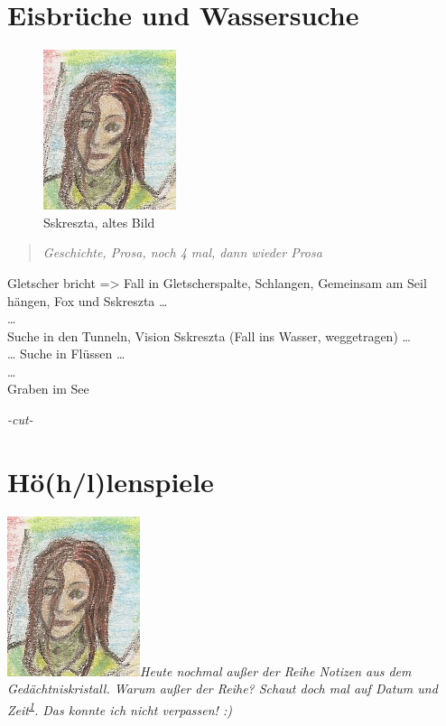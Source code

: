 \documentclass[11pt]{scrartcl}
\begin{document}
\section{Eisbrüche und Wassersuche}

\begin{figure}[htbp]
\centering
\includegraphics{sskreszta-portrait-alt-klein.png}
\caption{Sskreszta, altes Bild}
\end{figure}

\begin{quote}
\emph{Geschichte, Prosa, noch 4 mal, dann wieder Prosa}

\end{quote}
Gletscher bricht =\textgreater{} Fall in Gletscherspalte, Schlangen,
Gemeinsam am Seil hängen, Fox und Sskreszta \ldots{}\\ \ldots{}\\ Suche
in den Tunneln, Vision Sskreszta (Fall ins Wasser, weggetragen)
\ldots{}\\ \ldots{} Suche in Flüssen \ldots{}\\ \ldots{}\\ Graben im See

\emph{-cut-}

\section{Hö(h/l)lenspiele}

\includegraphics{sskreszta-portrait-alt-klein.png}\emph{Heute
nochmal außer der Reihe Notizen aus dem Gedächtniskristall. Warum außer
der Reihe? Schaut doch mal auf Datum und
Zeit\textsuperscript{\href{http://1w6.org/print/book/export/html/59\#fn:datum}{1}}.
Das konnte ich nicht verpassen! :)}
\end{document}
